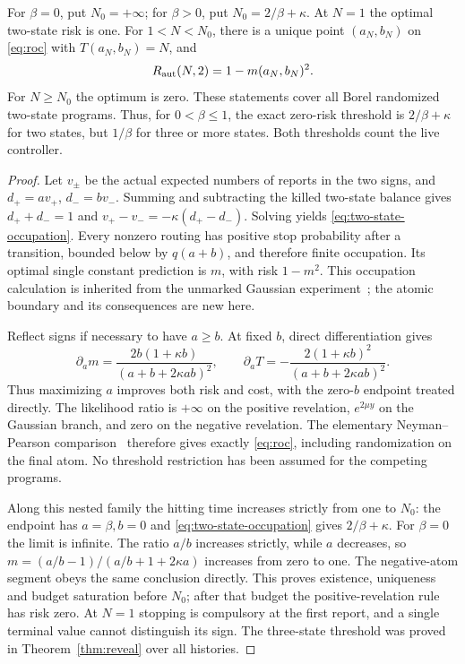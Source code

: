 \begin{theorem}\label{thm:two-state}
For $\beta=0$, put $N_0=+\infty$; for $\beta>0$, put
$N_0=2/\beta+\kappa$. At $N=1$ the optimal two-state risk is one. For $1<N<N_0$, there is a unique point $(a_N,b_N)$ on \eqref{eq:roc} with $T(a_N,b_N)=N$, and
\[
 R_{\mathrm{aut}}(N,2)=1-m(a_N,b_N)^2.
\]
For $N\ge N_0$ the optimum is zero. These statements cover all Borel randomized two-state programs. Thus, for $0<\beta\le1$, the exact zero-risk threshold is $2/\beta+\kappa$ for two states, but $1/\beta$ for three or more states. Both thresholds count the live controller.
\end{theorem}
\begin{proof}
Let $v_\pm$ be the actual expected numbers of reports in the two signs, and $d_+=av_+$, $d_-=bv_-$. Summing and subtracting the killed two-state balance gives
$d_++d_-=1$ and $v_+-v_-=-\kappa(d_+-d_-)$. Solving yields \eqref{eq:two-state-occupation}. Every nonzero routing has positive stop probability after a transition, bounded below by $q(a+b)$, and therefore finite occupation. Its optimal single constant prediction is $m$, with risk $1-m^2$. This occupation calculation is inherited from the unmarked Gaussian experiment~\cite{GTF51}; the atomic boundary and its consequences are new here.

Reflect signs if necessary to have $a\ge b$. At fixed $b$, direct differentiation gives
\[
 \partial_a m=\frac{2b(1+\kappa b)}{(a+b+2\kappa ab)^2},\qquad
 \partial_a T=-\frac{2(1+\kappa b)^2}{(a+b+2\kappa ab)^2}.
\]
Thus maximizing $a$ improves both risk and cost, with the zero-$b$ endpoint treated directly. The likelihood ratio is $+\infty$ on the positive revelation, $e^{2\mu y}$ on the Gaussian branch, and zero on the negative revelation. The elementary Neyman--Pearson comparison~\cite{NP} therefore gives exactly \eqref{eq:roc}, including randomization on the final atom. No threshold restriction has been assumed for the competing programs.

Along this nested family the hitting time increases strictly from one to $N_0$: the endpoint has $a=\beta,b=0$ and \eqref{eq:two-state-occupation} gives $2/\beta+\kappa$. For $\beta=0$ the limit is infinite. The ratio $a/b$ increases strictly, while $a$ decreases, so
$m=(a/b-1)/(a/b+1+2\kappa a)$ increases from zero to one. The negative-atom segment obeys the same conclusion directly. This proves existence, uniqueness and budget saturation before $N_0$; after that budget the positive-revelation rule has risk zero. At $N=1$ stopping is compulsory at the first report, and a single terminal value cannot distinguish its sign. The three-state threshold was proved in Theorem~\ref{thm:reveal} over all histories.
\end{proof}

